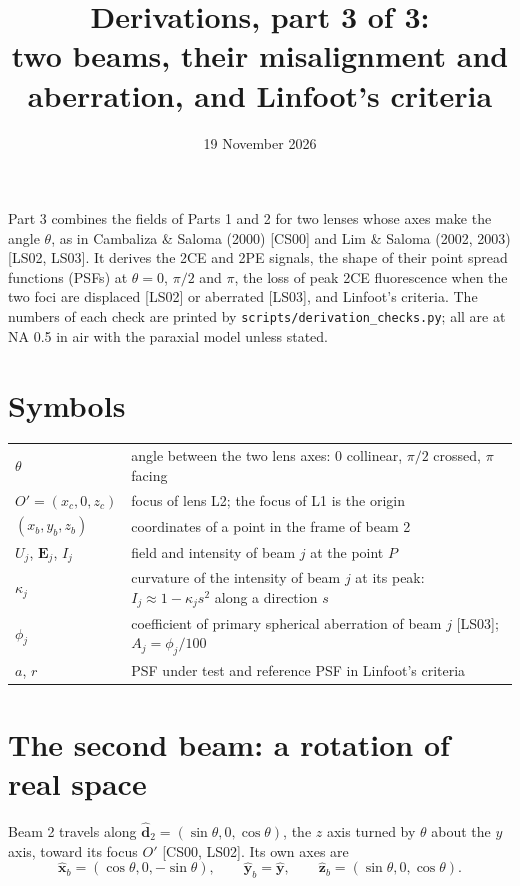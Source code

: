 \documentclass[11pt]{article}
\title{Derivations, part 3 of 3:\\ two beams, their misalignment and aberration, and Linfoot's criteria}
\date{19 November 2026}
\author{}
\begin{document}
\maketitle
\vspace{-2.5em}

Part 3 combines the fields of Parts 1 and 2 for two lenses whose axes make the angle $\theta$, as in Cambaliza \&
Saloma (2000) [CS00] and Lim \& Saloma (2002, 2003) [LS02, LS03]. It derives the 2CE and 2PE signals, the shape of
their point spread functions (PSFs) at $\theta = 0$, $\pi/2$ and $\pi$, the loss of peak 2CE fluorescence when the
two foci are displaced [LS02] or aberrated [LS03], and Linfoot's criteria. The numbers of each check are printed by
\texttt{scripts/derivation\_checks.py}; all are at NA 0.5 in air with the paraxial model unless stated.

\section*{Symbols}
\begin{center}\small\begin{tabular}{ll}\toprule
$\theta$ & angle between the two lens axes: 0 collinear, $\pi/2$ crossed, $\pi$ facing\\
$O' = (x_c, 0, z_c)$ & focus of lens L2; the focus of L1 is the origin\\
$(x_b, y_b, z_b)$ & coordinates of a point in the frame of beam 2\\
$U_j$, $\mathbf E_j$, $I_j$ & field and intensity of beam $j$ at the point $P$\\
$\kappa_j$ & curvature of the intensity of beam $j$ at its peak: $I_j \approx 1 - \kappa_js^2$ along a direction $s$\\
$\phi_j$ & coefficient of primary spherical aberration of beam $j$ [LS03]; $A_j = \phi_j/100$\\
$a$, $r$ & PSF under test and reference PSF in Linfoot's criteria\\\bottomrule
\end{tabular}\end{center}

\section{The second beam: a rotation of real space}
 Beam 2 travels along $\hat{\mathbf d}_2 = (\sin\theta, 0, \cos\theta)$, the $z$ axis turned by $\theta$ about the
$y$ axis, toward its focus $O'$ [CS00, LS02]. Its own axes are
\begin{equation}\hat{\mathbf x}_b = (\cos\theta, 0, -\sin\theta),\qquad \hat{\mathbf y}_b = \hat{\mathbf y},\qquad
\hat{\mathbf z}_b = (\sin\theta, 0, \cos\theta) .\end{equation}
\end{document}
